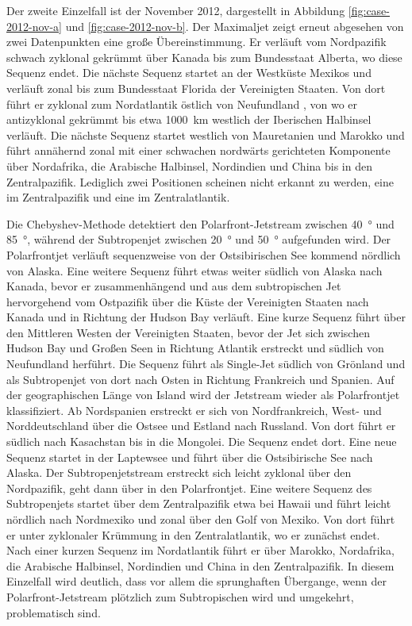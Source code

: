 Der zweite Einzelfall ist der November 2012, dargestellt in Abbildung \ref{fig:case-2012-nov-a} und \ref{fig:case-2012-nov-b}. Der Maximaljet zeigt erneut abgesehen von zwei Datenpunkten eine große Übereinstimmung. Er verläuft vom Nordpazifik schwach zyklonal gekrümmt über Kanada bis zum Bundesstaat Alberta, wo diese Sequenz endet. Die nächste Sequenz startet an der Westküste Mexikos und verläuft zonal bis zum Bundesstaat Florida der Vereinigten Staaten. Von dort führt er zyklonal zum Nordatlantik östlich von Neufundland , von wo er antizyklonal gekrümmt bis etwa \SI{1000}{\kilo\metre} westlich der Iberischen Halbinsel verläuft. Die nächste Sequenz startet westlich von Mauretanien und Marokko und führt annähernd zonal mit einer schwachen nordwärts gerichteten Komponente über Nordafrika, die Arabische Halbinsel, Nordindien und China bis in den Zentralpazifik. Lediglich zwei Positionen scheinen nicht erkannt zu werden, eine im Zentralpazifik und eine im Zentralatlantik.

Die Chebyshev-Methode detektiert den Polarfront-Jetstream zwischen \SI{40}{\degree} und \SI{85}{\degree}, während der Subtropenjet zwischen \SI{20}{\degree} und \SI{50}{\degree} aufgefunden wird. Der Polarfrontjet verläuft sequenzweise von der Ostsibirischen See kommend nördlich von Alaska. Eine weitere Sequenz führt etwas weiter südlich von Alaska nach Kanada, bevor er zusammenhängend und aus dem subtropischen Jet hervorgehend vom Ostpazifik über die Küste der Vereinigten Staaten nach Kanada und in Richtung der Hudson Bay verläuft. Eine kurze Sequenz führt über den Mittleren Westen der Vereinigten Staaten, bevor der Jet sich zwischen Hudson Bay und Großen Seen in Richtung Atlantik erstreckt und südlich von Neufundland herführt. Die Sequenz führt als Single-Jet südlich von Grönland und als Subtropenjet von dort nach Osten in Richtung Frankreich und Spanien. Auf der geographischen Länge von Island wird der Jetstream wieder als Polarfrontjet klassifiziert. Ab Nordspanien erstreckt er sich von Nordfrankreich, West- und Norddeutschland über die Ostsee und Estland nach Russland. Von dort führt er südlich nach Kasachstan bis in die Mongolei. Die Sequenz endet dort. Eine neue Sequenz startet in der Laptewsee und führt über die Ostsibirische See nach Alaska. Der Subtropenjetstream erstreckt sich leicht zyklonal über den Nordpazifik, geht dann über in den Polarfrontjet. Eine weitere Sequenz des Subtropenjets startet über dem Zentralpazifik etwa bei Hawaii und führt leicht nördlich nach Nordmexiko und zonal über den Golf von Mexiko. Von dort führt er unter zyklonaler Krümmung in den Zentralatlantik, wo er zunächst endet. Nach einer kurzen Sequenz im Nordatlantik führt er über Marokko, Nordafrika, die Arabische Halbinsel, Nordindien und China in den Zentralpazifik. In diesem Einzelfall wird deutlich, dass vor allem die sprunghaften Übergange, wenn der Polarfront-Jetstream plötzlich zum Subtropischen wird und umgekehrt, problematisch sind.

